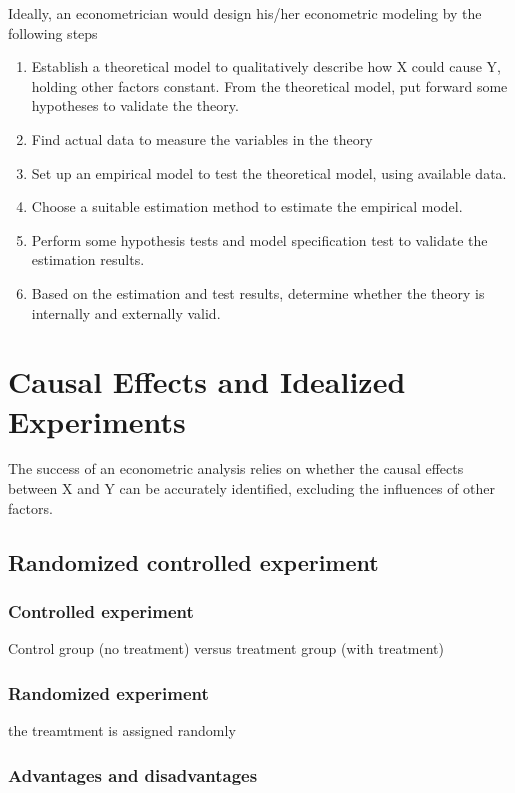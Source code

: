 \documentclass[a4paper,11pt]{article}
\begin{document}
Ideally, an econometrician would design his/her econometric modeling
by the following steps

\begin{enumerate}
\item Establish a theoretical model to qualitatively describe how X could
cause Y, holding other factors constant. From the theoretical
model, put forward some hypotheses to validate the theory.
\item Find actual data to measure the variables in the theory
\item Set up an empirical model to test the theoretical model, using
available data.
\item Choose a suitable estimation method to estimate the empirical model.
\item Perform some hypothesis tests and model specification test to
validate the estimation results.
\item Based on the estimation and test results, determine whether the theory
is internally and externally valid.
\end{enumerate}


\section{Causal Effects and Idealized Experiments}
\label{sec:orgc1941e0}

The success of an econometric analysis relies on whether the causal
effects between X and Y can be accurately identified, excluding the
influences of other factors.

\subsection{Randomized controlled experiment}
\label{sec:orga519c53}

\subsubsection*{Controlled experiment}
\label{sec:org185f632}

Control group (no treatment) versus treatment group (with treatment)

\subsubsection*{Randomized experiment}
\label{sec:org85d3fdd}
the treamtment is assigned randomly

\subsubsection*{Advantages and disadvantages}
\label{sec:orgda316d7}
\end{document}
